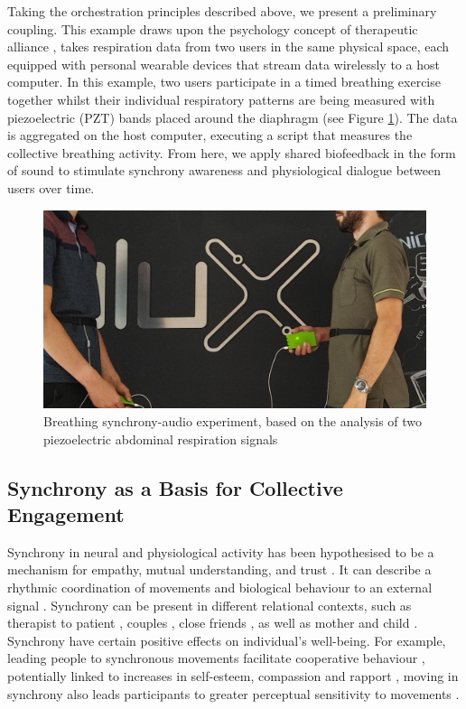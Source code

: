 Taking the orchestration principles described above, we present a preliminary coupling. This example draws upon the psychology concept of therapeutic alliance \cite{koole_synchrony_2016}, takes respiration data from two users in the same physical space, each equipped with personal wearable devices that stream data wirelessly to a host computer. In this example, two users participate in a timed breathing exercise together whilst their individual respiratory patterns are being measured with piezoelectric (PZT) bands placed around the diaphragm (see Figure \ref{fig:breathe}). The data is aggregated on the host computer, executing a script that measures the collective breathing activity. From here, we apply shared biofeedback in the form of sound to stimulate synchrony awareness and physiological dialogue between users over time.

\begin{figure}[htbp]
\centering
\includegraphics[width=0.7\linewidth]{Chapters/Figures/preliminary_actions/biosignals_actuation/breathe_sync.jpg}
\caption{Breathing synchrony-audio experiment, based on the analysis of two piezoelectric abdominal respiration signals}
\label{fig:breathe}
\end{figure}

\subsection*{Synchrony as a Basis for Collective Engagement}

Synchrony in neural and physiological activity has been hypothesised to be a mechanism for empathy, mutual understanding, and trust \cite{wallot_beyond_2016}. It can describe a rhythmic coordination of movements and biological behaviour to an external signal \cite{koole_synchrony_2016}. Synchrony can be present in different relational contexts, such as therapist to patient \cite{koole_synchrony_2016}, couples \cite{karvonen_sympathetic_2016}, close friends \cite{miles_birds_2011}, as well as mother and child \cite{butler_emotional_2013}. Synchrony have certain positive effects on individual’s well-being. For example, leading people to synchronous movements facilitate cooperative behaviour \cite{kirschner_joint_2010}, potentially linked to increases in self-esteem, compassion and rapport \cite{lumsden_sync_2014, fujiwara_rhythmic_2020}, moving in synchrony also leads participants to greater perceptual sensitivity to movements \cite{zamm_endogenous_2016}.

